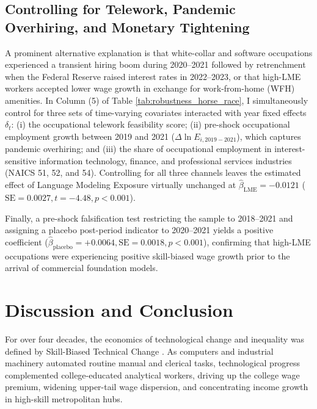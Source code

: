 \documentclass[12pt]{article}
\begin{document}
\subsection{Controlling for Telework, Pandemic Overhiring, and Monetary Tightening}

A prominent alternative explanation is that white-collar and software occupations experienced a transient hiring boom during 2020--2021 followed by retrenchment when the Federal Reserve raised interest rates in 2022--2023, or that high-LME workers accepted lower wage growth in exchange for work-from-home (WFH) amenities. In Column (5) of Table \ref{tab:robustness_horse_race}, I simultaneously control for three sets of time-varying covariates interacted with year fixed effects $\delta_t$: (i) the \citet{dingelNeiman2020} occupational telework feasibility score; (ii) pre-shock occupational employment growth between 2019 and 2021 ($\Delta \ln E_{i, 2019-2021}$), which captures pandemic overhiring; and (iii) the share of occupational employment in interest-sensitive information technology, finance, and professional services industries (NAICS 51, 52, and 54). Controlling for all three channels leaves the estimated effect of Language Modeling Exposure virtually unchanged at $\hat{\beta}_{\text{LME}} = -0.0121$ ($\text{SE} = 0.0027, t = -4.48, p < 0.001$).

Finally, a pre-shock falsification test restricting the sample to 2018--2021 and assigning a placebo post-period indicator to 2020--2021 yields a positive coefficient ($\hat{\beta}_{\text{placebo}} = +0.0064, \text{SE} = 0.0018, p < 0.001$), confirming that high-LME occupations were experiencing positive skill-biased wage growth prior to the arrival of commercial foundation models.

\section{Discussion and Conclusion}
\label{sec:conclusion}

For over four decades, the economics of technological change and inequality was defined by Skill-Biased Technical Change \citep{tinbergen1974, katzMurphy1992, goldinKatz2008, acemogluAutor2011}. As computers and industrial machinery automated routine manual and clerical tasks, technological progress complemented college-educated analytical workers, driving up the college wage premium, widening upper-tail wage dispersion, and concentrating income growth in high-skill metropolitan hubs.
\end{document}
